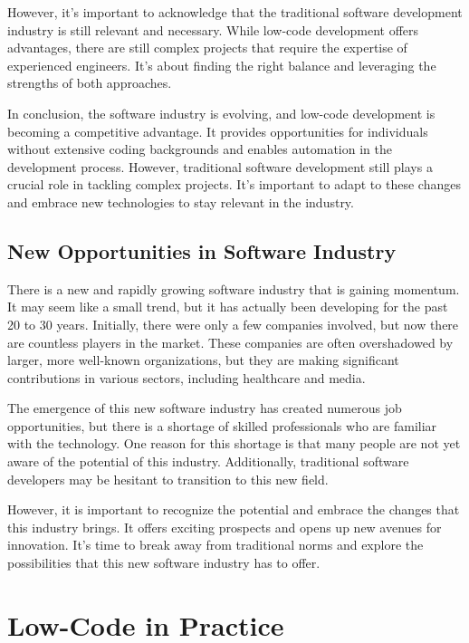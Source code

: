However, it's important to acknowledge that the traditional software
development industry is still relevant and necessary. While low-code
development offers advantages, there are still complex projects that
require the expertise of experienced engineers. It's about finding the
right balance and leveraging the strengths of both approaches.

In conclusion, the software industry is evolving, and low-code
development is becoming a competitive advantage. It provides
opportunities for individuals without extensive coding backgrounds and
enables automation in the development process. However, traditional
software development still plays a crucial role in tackling complex
projects. It's important to adapt to these changes and embrace new
technologies to stay relevant in the industry.

\subsection{New Opportunities in Software
    Industry}\label{new-opportunities-in-software-industry}

There is a new and rapidly growing software industry that is gaining
momentum. It may seem like a small trend, but it has actually been
developing for the past 20 to 30 years. Initially, there were only a few
companies involved, but now there are countless players in the market.
These companies are often overshadowed by larger, more well-known
organizations, but they are making significant contributions in various
sectors, including healthcare and media.

The emergence of this new software industry has created numerous job
opportunities, but there is a shortage of skilled professionals who are
familiar with the technology. One reason for this shortage is that many
people are not yet aware of the potential of this industry.
Additionally, traditional software developers may be hesitant to
transition to this new field.

However, it is important to recognize the potential and embrace the
changes that this industry brings. It offers exciting prospects and
opens up new avenues for innovation. It's time to break away from
traditional norms and explore the possibilities that this new software
industry has to offer.

\section{Low-Code in Practice}\label{low-code-in-practice}

